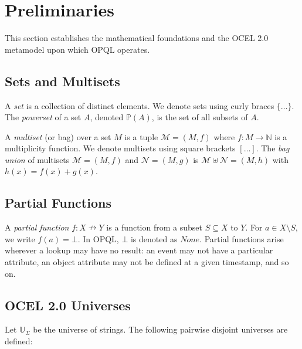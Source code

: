 \section{Preliminaries}

This section establishes the mathematical foundations and the OCEL 2.0 metamodel upon which OPQL operates.

\subsection{Sets and Multisets}

A \emph{set} is a collection of distinct elements. We denote sets using curly braces $\{ \dots \}$. The \emph{powerset} of a set $A$, denoted $\mathbb{P}(A)$, is the set of all subsets of $A$.

A \emph{multiset} (or bag) over a set $M$ is a tuple $\mathcal{M} = (M, f)$ where $f : M \to \mathbb{N}$ is a multiplicity function. We denote multisets using square brackets $[ \dots ]$. The \emph{bag union} of multisets $\mathcal{M} = (M, f)$ and $\mathcal{N} = (M, g)$ is $\mathcal{M} \uplus \mathcal{N} = (M, h)$ with $h(x) = f(x) + g(x)$.

\subsection{Partial Functions}

A \emph{partial function} $f : X \nrightarrow Y$ is a function from a subset $S \subseteq X$ to $Y$. For $a \in X \setminus S$, we write $f(a) = \bot$. In OPQL, $\bot$ is denoted as $None$. Partial functions arise wherever a lookup may have no result: an event may not have a particular attribute, an object attribute may not be defined at a given timestamp, and so on.

\subsection{OCEL 2.0 Universes}

Let $\mathbb{U}_\Sigma$ be the universe of strings. The following pairwise disjoint universes are defined:

